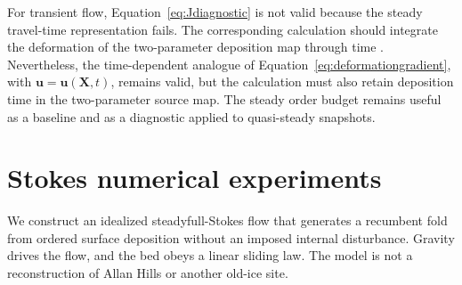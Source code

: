 \documentclass[review]{igs}
\providecommand{\DIFadd}[1]{{\protect\color{blue} \sf #1}} %
\providecommand{\DIFdel}[1]{{\protect\color{red} \scriptsize #1}} %
\providecommand{\DIFaddbegin}{} %
\providecommand{\DIFaddend}{} %
\providecommand{\DIFdelbegin}{} %
\providecommand{\DIFdelend}{} %
\newcommand{\DIFscaledelfig}{0.5}
\newlength{\DIFdelgraphicswidth} %
\newlength{\DIFdelgraphicsheight} %
\newcommand{\DIFaddincludegraphics}[2][]{{\color{blue}\fbox{\DIFOincludegraphics[#1]{#2}}}} %
\newcommand{\DIFdelincludegraphics}[2][]{%
\sbox{\DIFdelgraphicsbox}{\DIFOincludegraphics[#1]{#2}}%
\settoboxwidth{\DIFdelgraphicswidth}{\DIFdelgraphicsbox} %
\settoboxtotalheight{\DIFdelgraphicsheight}{\DIFdelgraphicsbox} %
\scalebox{\DIFscaledelfig}{%
\parbox[b]{\DIFdelgraphicswidth}{\usebox{\DIFdelgraphicsbox}\\[-\baselineskip] \rule{\DIFdelgraphicswidth}{0em}}\llap{\resizebox{\DIFdelgraphicswidth}{\DIFdelgraphicsheight}{%
\setlength{\unitlength}{\DIFdelgraphicswidth}%
\begin{picture}(1,1)%
\thicklines\linethickness{2pt} %
{\color[rgb]{1,0,0}\put(0,0){\framebox(1,1){}}}%
{\color[rgb]{1,0,0}\put(0,0){\line( 1,1){1}}}%
{\color[rgb]{1,0,0}\put(0,1){\line(1,-1){1}}}%
\end{picture}%
}\hspace*{3pt}}} %
} %
\DeclareRobustCommand{\DIFaddbegin}{\DIFOaddbegin \let\includegraphics\DIFaddincludegraphics} %
\DeclareRobustCommand{\DIFaddend}{\DIFOaddend \let\includegraphics\DIFOincludegraphics} %
\DeclareRobustCommand{\DIFdelbegin}{\DIFOdelbegin \let\includegraphics\DIFdelincludegraphics} %
\DeclareRobustCommand{\DIFdelend}{\DIFOaddend \let\includegraphics\DIFOincludegraphics} %
\begin{document}
For transient flow, Equation~\ref{eq:Jdiagnostic} is not valid because the steady travel-time representation fails. The \DIFdelbegin \DIFdel{corresponding calculation should integrate the deformation of the two-parameter deposition map through time . Nevertheless, the }\DIFdelend \DIFaddbegin \DIFadd{time-dependent analogue of Equation~\ref{eq:deformationgradient}, with \(\bm{u}=\bm{u}(\bm{X},t)\), remains valid, but the calculation must also retain deposition time in the two-parameter source map. The }\DIFaddend steady order budget remains useful as a baseline and as a diagnostic applied to quasi-steady snapshots.

\DIFdelbegin %
\DIFdelend \DIFaddbegin \section{Stokes numerical experiments}
\DIFaddend 

\DIFdelbegin \DIFdel{We construct an idealized steadyfull-Stokes flow that generates a recumbent fold from ordered surface deposition without an imposed internal disturbance. Gravity drives the flow, and the bed obeys a linear sliding law. The model is not a reconstruction of Allan Hills or another old-ice site.
}%
\end{document}
